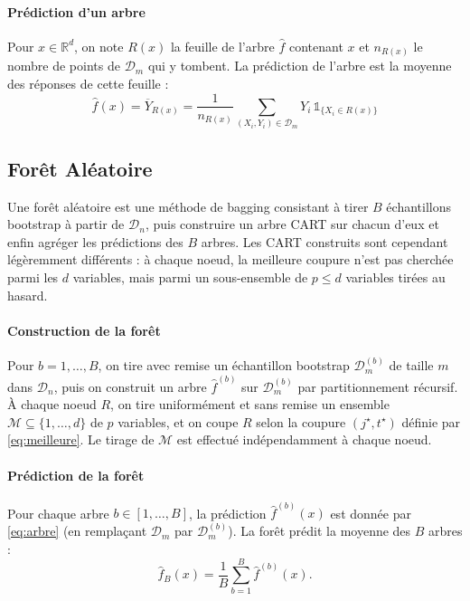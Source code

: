 \paragraph{Prédiction d'un arbre}

Pour $x \in \mathbb{R}^d$, on note $R(x)$ la feuille de l'arbre $\hat f$ contenant $x$ et $n_{R(x)}$ le nombre de points de $\mathcal{D}_m$  qui y tombent. La prédiction de
l'arbre est la moyenne des réponses de cette feuille :
\begin{equation}
	\label{eq:arbre}
	\hat f(x) = \overline{Y}_{R(x)}
	= \frac{1}{n_{R(x)}}
	\sum_{(X_i,Y_i) \in \mathcal{D}_m} Y_i \, \mathds{1}_{\{X_i \in R(x)\}}
\end{equation}

\subsection{Forêt Aléatoire} 
\label{subsection:RF}
Une forêt aléatoire \cite{breiman2001} est une méthode de bagging consistant à tirer $B$ échantillons bootstrap à partir de $\mathcal{D}_n$, puis construire un arbre CART sur chacun d'eux et enfin agréger les prédictions des $B$ arbres. Les CART construits sont cependant légèremment différents : à chaque noeud, la meilleure coupure n'est pas cherchée parmi les $d$ variables, mais parmi un sous-ensemble de $p \le d$ variables tirées au hasard.

\paragraph{Construction de la forêt}
Pour $b = 1, \dots, B$, on tire avec remise un échantillon bootstrap $\mathcal{D}_m^{(b)}$ de taille $m$ dans $\mathcal{D}_n$, puis on construit un arbre $\hat f^{(b)}$ sur $\mathcal{D}_m^{(b)}$ par partitionnement récursif. À chaque noeud $R$, on tire uniformément et sans remise un ensemble $\mathcal{M} \subseteq \{1,\dots,d\}$ de $p$ variables, et on coupe $R$ selon la coupure $(j^\star, t^\star)$ définie par \eqref{eq:meilleure}. Le tirage de $\mathcal{M}$ est effectué indépendamment à chaque noeud. 

\paragraph{Prédiction de la forêt}
Pour chaque arbre $b \in [1, \ldots, B]$, la prédiction $\hat f^{(b)}(x)$ est donnée par \eqref{eq:arbre} (en remplaçant $\mathcal{D}_m$ par $\mathcal{D}_m^{(b)}$). La forêt prédit la moyenne des $B$ arbres :
\begin{equation}\label{eq:foret}
	\hat f_B(x) = \frac{1}{B} \sum_{b=1}^{B} \hat f^{(b)}(x).
\end{equation}

